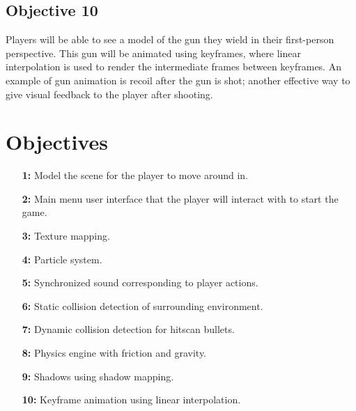 \documentclass {article}
\begin{document}
\subsection{Objective 10}
Players will be able to see a model of the gun they wield in their first-person perspective. This gun will be animated using keyframes, where linear interpolation is used to render the intermediate frames between keyframes. An example of gun animation is recoil after the gun is shot; another effective way to give visual feedback to the player after shooting.


\newpage

\section{Objectives}\label{sec:objectives}
\begin{enumerate}
    \item[\textbf{1:}]
    Model the scene for the player to move around in.

    \item[\textbf{2:}]
    Main menu user interface that the player will interact with to start the game.

    \item[\textbf{3:}]
    Texture mapping.

    \item[\textbf{4:}]
    Particle system.

    \item[\textbf{5:}]
    Synchronized sound corresponding to player actions.

    \item[\textbf{6:}]
    Static collision detection of surrounding environment.

    \item[\textbf{7:}]
    Dynamic collision detection for hitscan bullets.

    \item[\textbf{8:}]
    Physics engine with friction and gravity.

    \item[\textbf{9:}]
    Shadows using shadow mapping.

    \item[\textbf{10:}]
    Keyframe animation using linear interpolation.
\end{enumerate}

\newpage
\printbibliography[heading=bibintoc, title={References}] %
\end{document}
